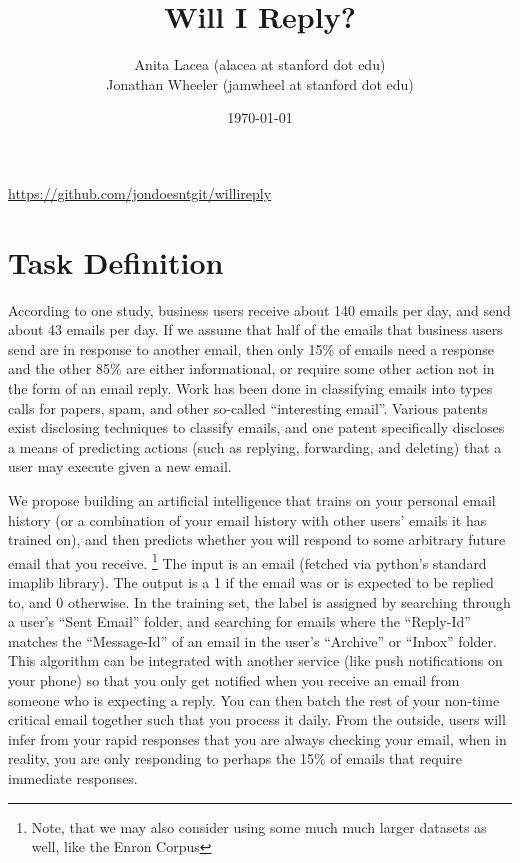 \documentclass{article}
\title{Will I Reply?}
\author{Anita Lacea (alacea at stanford dot edu)\\Jonathan Wheeler (jamwheel at stanford dot edu)}
\date{\today}
\begin{document}
\maketitle
\vspace{-1cm}
\begin{center}
\href{https://github.com/jondoesntgit/willireply}{https://github.com/jondoesntgit/willireply}
\end{center}

\section{Task Definition}
According to one study, business users receive about 140 emails per day, and send about 43 emails per day.\cite{emailstatistics} If we assume that half of the emails that business users send are in response to another email, then only 15\% of emails need a response and the other 85\% are either informational, or require some other action not in the form of an email reply. Work has been done in classifying emails into types calls for papers\cite{learningrulesthatclassifyemail}, spam\cite{filteringjunkemail}, and other so-called ``interesting email''\cite{emailclassification}. Various patents exist disclosing techniques to classify emails\cite{Goodman:2014ug,Bellegarda:2010wk,Romero:2005vs}, and one patent specifically discloses a means of predicting actions (such as replying, forwarding, and deleting) that a user may execute given a new email\cite{Weber:2012tv}.

We propose building an artificial intelligence that trains on your personal email history (or a combination of your email history with other users' emails it has trained on), and then predicts whether you will respond to some arbitrary future email that you receive.
\footnote{Note, that we may also consider using some much much larger datasets as well, like the Enron Corpus\cite{enroncorpus}} The input is an email (fetched via python's standard imaplib library). 
The output is a 1 if the email was or is expected to be replied to, and 0 otherwise. 
In the training set, the label is assigned by searching through a user's ``Sent Email'' folder, and searching for emails where the ``Reply-Id'' matches the ``Message-Id'' of an email in the user's ``Archive'' or ``Inbox'' folder. 
This algorithm can be integrated with another service (like push notifications on your phone) so that you only get notified when you receive an email from someone who is expecting a reply. 
You can then batch the rest of your non-time critical email together such that you process it daily. 
From the outside, users will infer from your rapid responses that you are always checking your email, when in reality, you are only responding to perhaps the 15\% of emails that require immediate responses.
\end{document}
